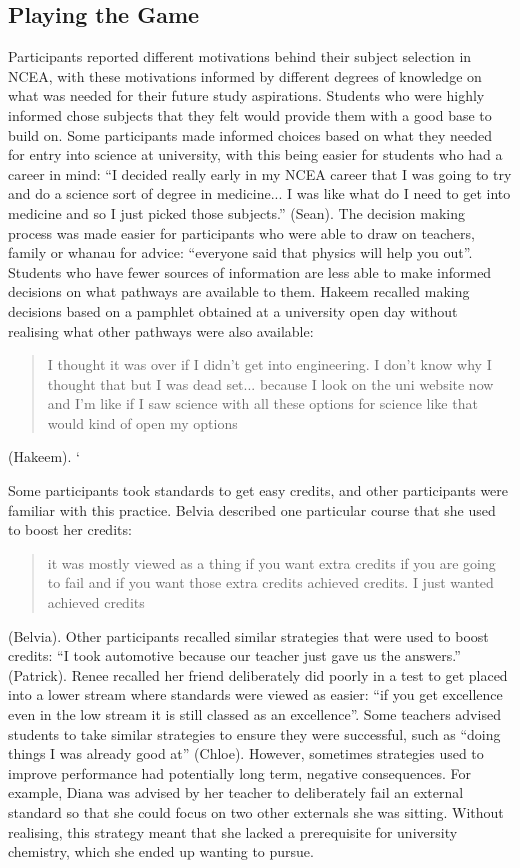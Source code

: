 \documentclass[a4paper,man,natbib]{apa6}
\begin{document}
\subsection{Playing the Game}
Participants reported different motivations behind their subject selection in NCEA, with these motivations informed by different degrees of knowledge on what was needed for their future study aspirations. Students who were highly informed chose subjects that they felt would provide them with a good base to build on. Some participants made informed choices based on what they needed for entry into science at university, with this being easier for students who had a career in mind: ``I decided really early in my NCEA career that I was going to try and do a science sort of degree in medicine... I was like what do I need to get into medicine and so I just picked those subjects.'' (Sean). The decision making process was made easier for participants who were able to draw on teachers, family or whanau for advice: ``everyone said that physics will help you out''. Students who have fewer sources of information are less able to make informed decisions on what pathways are available to them. Hakeem recalled making decisions based on a pamphlet obtained at a university open day without realising what other pathways were also available: \blockquote{I thought it was over if I didn't get into engineering. I don’t know why I thought that but I was dead set... because I look on the uni website now and I'm like if I saw science with all these options for science like that would kind of open my options} (Hakeem).
 `

Some participants took standards to get easy credits, and other participants were familiar with this practice. Belvia described one particular course that she used to boost her credits: \blockquote{it was mostly viewed as a thing if you want extra credits if you are going to fail and if you want those extra credits achieved credits. I just wanted achieved credits} (Belvia). Other participants recalled similar strategies that were used to boost credits: ``I took automotive because our teacher just gave us the answers.'' (Patrick). Renee recalled her friend deliberately did poorly in a test to get placed into a lower stream where standards were viewed as easier: ``if you get excellence even in the low stream it is still classed as an excellence''. Some teachers advised students to take similar strategies to ensure they were successful, such as ``doing things I was already good at'' (Chloe). However, sometimes strategies used to improve performance had potentially long term, negative consequences. For example, Diana was advised by her teacher to deliberately fail an external standard so that she could focus on two other externals she was sitting. Without realising, this strategy meant that she lacked a prerequisite for university chemistry, which she ended up wanting to pursue. 
\end{document}
